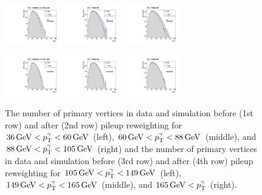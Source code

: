 \begin{figure}[ht]
    \includegraphics[width=0.22\textwidth]{figures/resolution/eventSelection/NVtxComparisonWoWeights4.pdf}
    \includegraphics[width=0.22\textwidth]{figures/resolution/eventSelection/NVtxComparisonWoWeights5.pdf}
    \includegraphics[width=0.22\textwidth]{figures/resolution/eventSelection/NVtxComparisonWoWeights6.pdf}

    \includegraphics[width=0.22\textwidth]{figures/resolution/eventSelection/NVtxComparison4.pdf}
    \includegraphics[width=0.22\textwidth]{figures/resolution/eventSelection/NVtxComparison5.pdf}
    \includegraphics[width=0.22\textwidth]{figures/resolution/eventSelection/NVtxComparison6.pdf}
   \caption{The number of primary vertices in data and simulation before (1st row) and after (2nd row) pileup reweighting for $36\,\text{Ge}\kern-0.06667em\text{V} < p_{\text{T}}^{\gamma} < 60\,\text{Ge}\kern-0.06667em\text{V}$ (left), $60\,\text{Ge}\kern-0.06667em\text{V} < p_{\text{T}}^{\gamma} < 88\,\text{Ge}\kern-0.06667em\text{V}$ (middle), 
            and $88\,\text{Ge}\kern-0.06667em\text{V} < p_{\text{T}}^{\gamma} < 105\,\text{Ge}\kern-0.06667em\text{V}$ (right) and the number of primary vertices in data and simulation before (3rd row) and after (4th row) pileup reweighting for $105\,\text{Ge}\kern-0.06667em\text{V} < p_{\text{T}}^{\gamma} < 149\,\text{Ge}\kern-0.06667em\text{V}$ (left), 
            $149\,\text{Ge}\kern-0.06667em\text{V} < p_{\text{T}}^{\gamma} < 165\,\text{Ge}\kern-0.06667em\text{V}$ (middle), and $165\,\text{Ge}\kern-0.06667em\text{V} < p_{\text{T}}^{\gamma}$ (right).}
  \label{res:fig:PUreweighting}
\end{figure}

